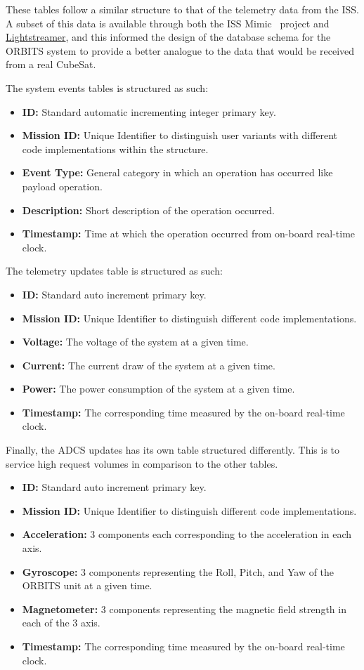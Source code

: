 \documentclass[a4paper,12pt,titlepage]{report}
\begin{document}
These tables follow a similar structure to that of the telemetry data from the ISS. A subset of this data is available through both the ISS Mimic~\cite{ISS-Mimic} project and \href{https://lightstreamer.com/}{Lightstreamer}, and this informed the design of the database schema for the ORBITS system to provide a better analogue to the data that would be received from a real CubeSat. 

The system events tables is structured as such:
\begin{itemize}
    \item \textbf{ID:} Standard automatic incrementing integer primary key.
    \item \textbf{Mission ID:} Unique Identifier to distinguish user variants with different code implementations within the structure.
    \item \textbf{Event Type:} General category in which an operation has occurred like payload operation.
    \item \textbf{Description:} Short description of the operation occurred.
    \item \textbf{Timestamp:} Time at which the operation occurred from on-board real-time clock.
\end{itemize}

The telemetry updates table is structured as such:
\begin{itemize}
    \item \textbf{ID:} Standard auto increment primary key.
    \item \textbf{Mission ID:} Unique Identifier to distinguish different code implementations.
    \item \textbf{Voltage:} The voltage of the system at a given time.
    \item \textbf{Current:} The current draw of the system at a given time.
    \item \textbf{Power:} The power consumption of the system at a given time.
    \item \textbf{Timestamp:} The corresponding time measured by the on-board real-time clock.
\end{itemize}

Finally, the ADCS updates has its own table structured differently. This is to service high request volumes in comparison to the other tables.

\begin{itemize}
    \item \textbf{ID:} Standard auto increment primary key.
    \item \textbf{Mission ID:} Unique Identifier to distinguish different code implementations.
    \item \textbf{Acceleration:} 3 components each corresponding to the acceleration in each axis.
    \item \textbf{Gyroscope:} 3 components representing the Roll, Pitch, and Yaw of the ORBITS unit at a given time.
    \item \textbf{Magnetometer:} 3 components representing the magnetic field strength in each of the 3 axis.
    \item \textbf{Timestamp:} The corresponding time measured by the on-board real-time clock.
\end{itemize}
\end{document}
